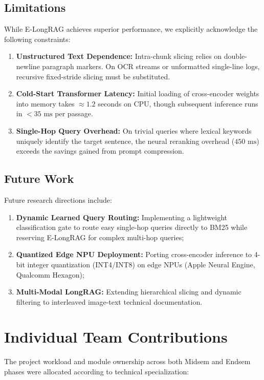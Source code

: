 \documentclass[lettersize,journal]{IEEEtran}
\begin{document}
\subsection{Limitations}
While E-LongRAG achieves superior performance, we explicitly acknowledge the following constraints:
\begin{enumerate}
    \item \textbf{Unstructured Text Dependence:} Intra-chunk slicing relies on double-newline paragraph markers. On OCR streams or unformatted single-line logs, recursive fixed-stride slicing must be substituted.
    \item \textbf{Cold-Start Transformer Latency:} Initial loading of cross-encoder weights into memory takes $\approx 1.2$ seconds on CPU, though subsequent inference runs in $<35\text{ ms}$ per passage.
    \item \textbf{Single-Hop Query Overhead:} On trivial queries where lexical keywords uniquely identify the target sentence, the neural reranking overhead ($450\text{ ms}$) exceeds the savings gained from prompt compression.
\end{enumerate}

\subsection{Future Work}
Future research directions include:
\begin{enumerate}
    \item \textbf{Dynamic Learned Query Routing:} Implementing a lightweight classification gate to route easy single-hop queries directly to BM25 while reserving E-LongRAG for complex multi-hop queries;
    \item \textbf{Quantized Edge NPU Deployment:} Porting cross-encoder inference to 4-bit integer quantization (INT4/INT8) on edge NPUs (Apple Neural Engine, Qualcomm Hexagon);
    \item \textbf{Multi-Modal LongRAG:} Extending hierarchical slicing and dynamic filtering to interleaved image-text technical documentation.
\end{enumerate}

\section{Individual Team Contributions}
The project workload and module ownership across both Midsem and Endsem phases were allocated according to technical specialization:
\end{document}
